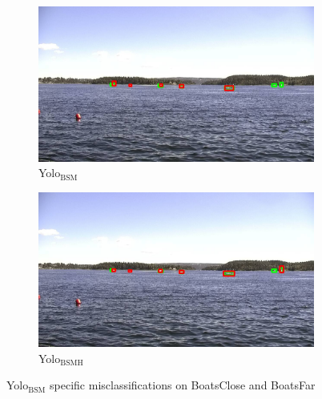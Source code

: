 \begin{figure}[h!]
\begin{subfigure}{.5\textwidth}
  \centering
  \includegraphics[width=0.9\linewidth]{results/case_buildings/yolo23/3better/yolo2/selected_06_25_frame0057.jpg}
  \caption{Yolo$_{\text{BSM}}$}
\end{subfigure}%
\begin{subfigure}{.5\textwidth}
  \centering
  \includegraphics[width=.9\linewidth]{results/case_buildings/yolo23/3better/yolo3/selected_06_25_frame0057.jpg}
  \caption{Yolo$_{\text{BSMH}}$}
\end{subfigure}
\caption{Yolo$_{\text{BSM}}$ specific misclassifications on BoatsClose and BoatsFar}
\label{img:yolo2_misclas}


\end{figure}
